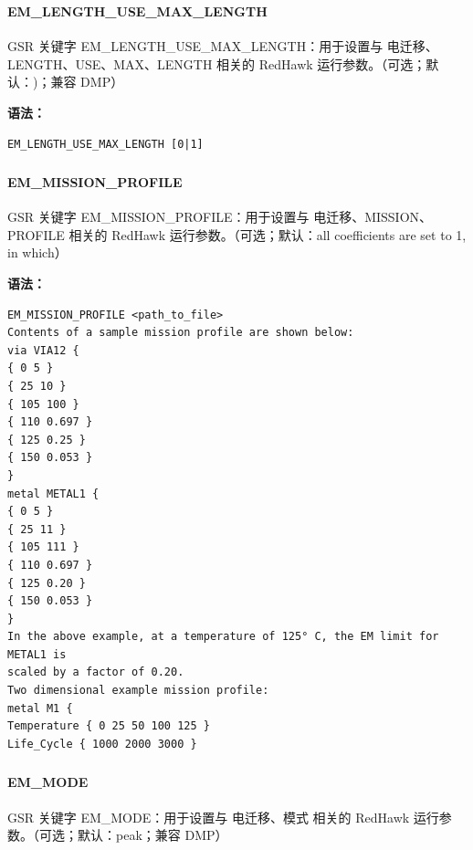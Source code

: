 \subsubsection{}
\paragraph*{EM_LENGTH_USE_MAX_LENGTH}

GSR 关键字 EM_LENGTH_USE_MAX_LENGTH：用于设置与 电迁移、LENGTH、USE、MAX、LENGTH 相关的 RedHawk 运行参数。（可选；默认：)；兼容 DMP）

\textbf{语法：}
\begin{lstlisting}
EM_LENGTH_USE_MAX_LENGTH [0|1]
\end{lstlisting}

\subsubsection{}
\paragraph*{EM_MISSION_PROFILE}

GSR 关键字 EM_MISSION_PROFILE：用于设置与 电迁移、MISSION、PROFILE 相关的 RedHawk 运行参数。（可选；默认：all coefficients are set to 1, in which）

\textbf{语法：}
\begin{lstlisting}
EM_MISSION_PROFILE <path_to_file>
Contents of a sample mission profile are shown below:
via VIA12 {
{ 0 5 }
{ 25 10 }
{ 105 100 }
{ 110 0.697 }
{ 125 0.25 }
{ 150 0.053 }
}
metal METAL1 {
{ 0 5 }
{ 25 11 }
{ 105 111 }
{ 110 0.697 }
{ 125 0.20 }
{ 150 0.053 }
}
In the above example, at a temperature of 125° C, the EM limit for METAL1 is
scaled by a factor of 0.20.
Two dimensional example mission profile:
metal M1 {
Temperature { 0 25 50 100 125 }
Life_Cycle { 1000 2000 3000 }
\end{lstlisting}

\subsubsection{}
\paragraph*{EM_MODE}

GSR 关键字 EM_MODE：用于设置与 电迁移、模式 相关的 RedHawk 运行参数。（可选；默认：peak；兼容 DMP）

